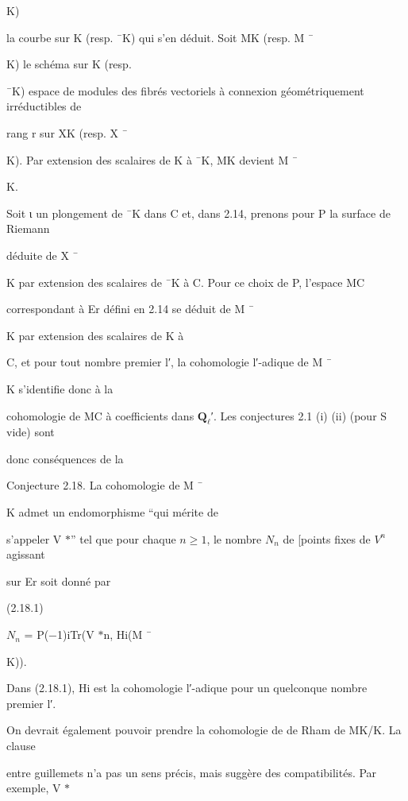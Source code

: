 \documentclass[11pt]{article}
\begin{document}
\noindent K)\par
\noindent la courbe sur K (resp. ¯K) qui s’en déduit. Soit MK (resp. M ¯\par
\noindent K) le schéma sur K (resp.\par
\noindent ¯K) espace de modules des fibrés vectoriels à connexion géométriquement irréductibles de\par
\noindent rang r sur XK (resp. X ¯\par
\noindent K). Par extension des scalaires de K à ¯K, MK devient M ¯\par
\noindent K.\par
\noindent Soit ι un plongement de ¯K dans C et, dans 2.14, prenons pour P la surface de Riemann\par
\noindent déduite de X ¯\par
\noindent K par extension des scalaires de ¯K à C. Pour ce choix de P, l’espace MC\par
\noindent correspondant à Er défini en 2.14 se déduit de M ¯\par
\noindent K par extension des scalaires de K à\par
\noindent C, et pour tout nombre premier l′, la cohomologie l′-adique de M ¯\par
\noindent K s’identifie donc à la\par
\noindent cohomologie de MC à coefficients dans \(\mathbf Q_{\ell}\)′. Les conjectures 2.1 (i) (ii) (pour S vide) sont\par
\noindent donc conséquences de la\par
\noindent Conjecture 2.18. La cohomologie de M ¯\par
\noindent K admet un endomorphisme “qui mérite de\par
\noindent s’appeler V \(*\)” tel que pour chaque \(n\geq 1\), le nombre \(N_n\) de [points fixes de \(V^n\) agissant\par
\noindent sur Er soit donné par\par
\noindent (2.18.1)\par
\noindent \(N_n\) = P(−1)iTr(V \(*\)n, Hi(M ¯\par
\noindent K)).\par
\noindent Dans (2.18.1), Hi est la cohomologie l′-adique pour un quelconque nombre premier l′.\par
\noindent On devrait également pouvoir prendre la cohomologie de de Rham de MK/K. La clause\par
\noindent entre guillemets n’a pas un sens précis, mais suggère des compatibilités. Par exemple, V \(*\)\par
\end{document}
